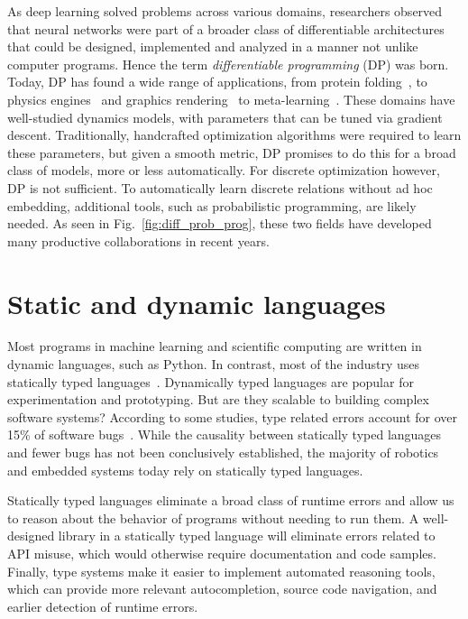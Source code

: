 \documentclass[12pt,initial,twoside,maitrise]{dms}
\numberwithin{equation}{section}
\numberwithin{table}{chapter}
\numberwithin{figure}{chapter}
\begin{document}
As deep learning solved problems across various domains, researchers observed that neural networks were part of a broader class of differentiable architectures that could be designed, implemented and analyzed in a manner not unlike computer programs. Hence the term \textit{differentiable programming} (DP) was born. Today, DP has found a wide range of applications, from protein folding~\cite{alquraishi2018end}, to physics engines~\cite{de2018end,DBLP:journals_corr_DegraveHDW16} and graphics rendering~\cite{loper2014opendr} to meta-learning~\cite{liu2018darts}. These domains have well-studied dynamics models, with parameters that can be tuned via gradient descent. Traditionally, handcrafted optimization algorithms were required to learn these parameters, but given a smooth metric, DP promises to do this for a broad class of models, more or less automatically. For discrete optimization however, DP is not sufficient. To automatically learn discrete relations without ad hoc embedding, additional tools, such as probabilistic programming, are likely needed. As seen in Fig.~\ref{fig:diff_prob_prog}, these two fields have developed many productive collaborations in recent years.

\section{Static and dynamic languages}

Most programs in machine learning and scientific computing are written in dynamic languages, such as Python. In contrast, most of the industry uses statically typed languages~\cite{github}. Dynamically typed languages are popular for experimentation and prototyping. But are they scalable to building complex software systems? According to some studies, type related errors account for over 15\% of software bugs~\cite{gao2017type}. While the causality between statically typed languages and fewer bugs has not been conclusively established, the majority of robotics~\cite{Areserio54:online} and embedded systems today rely on statically typed languages.

Statically typed languages eliminate a broad class of runtime errors and allow us to reason about the behavior of programs without needing to run them. A well-designed library in a statically typed language will eliminate errors related to API misuse, which would otherwise require documentation and code samples. Finally, type systems make it easier to implement automated reasoning tools, which can provide more relevant autocompletion, source code navigation, and earlier detection of runtime errors.
\end{document}
